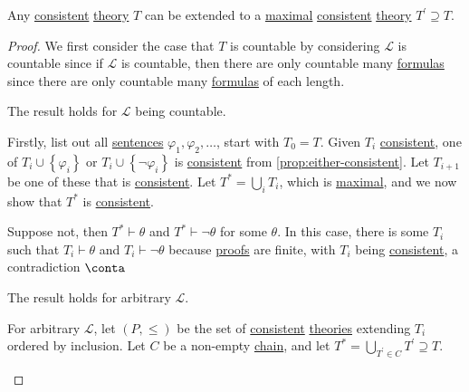 \begin{theorem}\label{thm:extend-to-maximal}
	Any \hyperref[def:consistent]{consistent} \hyperref[def:theory]{theory} \(T\) can be extended to a \hyperref[def:maximal]{maximal} \hyperref[def:consistent]{consistent} \hyperref[def:theory]{theory} \(T^\prime \supseteq T\).
\end{theorem}
\begin{proof}
	We first consider the case that \(T\) is countable by considering \(\mathcal{L} \) is countable since if \(\mathcal{L} \) is countable, then there are only countable many \hyperref[def:formula]{formulas} since there are only countable many \hyperref[def:formula]{formulas} of each length.

	\begin{claim}
		The result holds for \(\mathcal{L} \) being countable.
	\end{claim}
	\begin{explanation}
		Firstly, list out all \hyperref[def:sentence]{sentences} \(\varphi _1, \varphi _2, \dots \), start with \(T_0 = T\). Given \(T_i\) \hyperref[def:consistent]{consistent}, one of \(T_i \cup \left\{ \varphi _i \right\} \) or \(T_i \cup \left\{ \lnot \varphi _i \right\} \) is \hyperref[def:consistent]{consistent} from \autoref{prop:either-consistent}. Let \(T_{i+1} \) be one of these that is \hyperref[def:consistent]{consistent}. Let \(T^{\ast} = \bigcup_{i} T_i \), which is \hyperref[def:maximal]{maximal}, and we now show that \(T^{\ast} \) is \hyperref[def:consistent]{consistent}.

		Suppose not, then \(T^{\ast} \vdash \theta \) and \(T^{\ast} \vdash \lnot \theta \) for some \(\theta \). In this case, there is some \(T_i\) such that \(T_i \vdash \theta \) and \(T_i \vdash \lnot \theta \) because \hyperref[def:proof]{proofs} are finite, with \(T_i\) being \hyperref[def:consistent]{consistent}, a contradiction \(\conta\)
	\end{explanation}

	\begin{claim}
		The result holds for arbitrary \(\mathcal{L} \).
	\end{claim}
	\begin{explanation}
		For arbitrary \(\mathcal{L} \), let \((P, \leq )\) be the set of \hyperref[def:consistent]{consistent} \hyperref[def:theory]{theories} extending \(T_i\) ordered by inclusion. Let \(C\) be a non-empty \hyperref[def:chain]{chain}, and let \(T^{\ast} = \bigcup_{T^\prime \in C} T^\prime \supseteq T \).


\end{explanation}
\end{proof}
